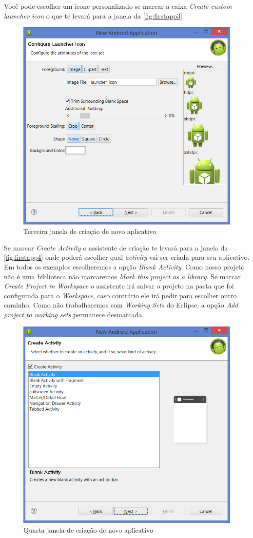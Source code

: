 \documentclass[a4paper,12pt,brazil,oneside]{book}
\begin{document}
Você pode escolher um ícone personalizado se marcar a caixa \emph{Create custom launcher icon} o que te levará para a janela da \autoref{fig:firstapp3}. 

\begin{figure}[H]
  \centering
  \includegraphics[width=.75\textwidth]{figuras/firstapp/firstapp3.png}
  \caption{Terceira janela de criação de novo aplicativo}
  \label{fig:firstapp3}
\end{figure}
  
Se marcar \emph{Create Activity}  o assistente de criação te levará para a janela da \autoref{fig:firstapp4} onde poderá escolher qual \emph{activity} vai ser criada para seu aplicativo. Em todos os exemplos escolheremos a opção \emph{Blank Activity}. Como nosso projeto não é uma biblioteca não marcaremos \emph{Mark this project as a library}. Se marcar \emph{Create Project in Workspace} o assistente irá salvar o projeto na pasta que foi configurada para o \emph{Workspace}, caso contrário ele irá pedir para escolher outro caminho. Como não trabalharemos com \emph{Working Sets} do Eclipse, a opção \emph{Add project to working sets} permanece desmarcada. 
  
\begin{figure}[H]
  \centering
  \includegraphics[width=.75\textwidth]{figuras/firstapp/firstapp4.png}
  \caption{Quarta janela de criação de novo aplicativo}
  \label{fig:firstapp4}
\end{figure}
 
\end{document}
